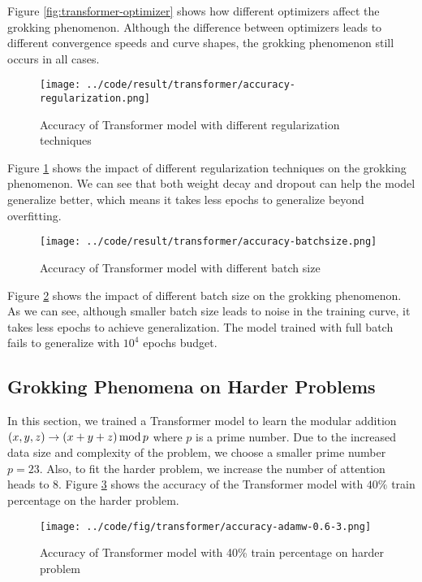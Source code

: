 \documentclass{article}
\begin{document}
Figure \ref{fig:transformer-optimizer} shows how different optimizers affect the grokking phenomenon. Although the difference between optimizers leads to different convergence speeds and curve shapes, the grokking phenomenon still occurs in all cases.

\begin{figure}[ht]
    \centering
    \texttt{[image: ../code/result/transformer/accuracy-regularization.png]}
    \caption{Accuracy of Transformer model with different regularization techniques}
    \label{fig:transformer-regularization}
\end{figure}

Figure \ref{fig:transformer-regularization} shows the impact of different regularization techniques on the grokking phenomenon. We can see that both  weight decay and dropout can help the model generalize better, which means it takes less epochs to generalize beyond overfitting.

\begin{figure}[ht]
    \centering
    \texttt{[image: ../code/result/transformer/accuracy-batchsize.png]}
    \caption{Accuracy of Transformer model with different batch size}
    \label{fig:transformer-batchsize}
\end{figure}

Figure \ref{fig:transformer-batchsize} shows the impact of different batch size on the grokking phenomenon. As we can see, although smaller batch size leads to noise in the training curve, it takes less epochs to achieve generalization. The model trained with full batch fails to generalize with $10^4$ epochs budget.

\subsection{Grokking Phenomena on Harder Problems}

In this section, we trained a Transformer model to learn the modular addition $(x, y, z) \rightarrow (x + y + z)\, {\rm mod}\, p$ where $p$ is a prime number. Due to the increased data size and complexity of the problem, we choose a smaller prime number $p=23$. Also, to fit the harder problem, we increase the number of attention heads to 8. Figure \ref{fig:transformer-harder} shows the accuracy of the Transformer model with $40\%$ train percentage on the harder problem.

\begin{figure}[ht]
    \centering
    \texttt{[image: ../code/fig/transformer/accuracy-adamw-0.6-3.png]}
    \caption{Accuracy of Transformer model with 40\% train percentage on harder problem}
    \label{fig:transformer-harder}
\end{figure}
\end{document}
